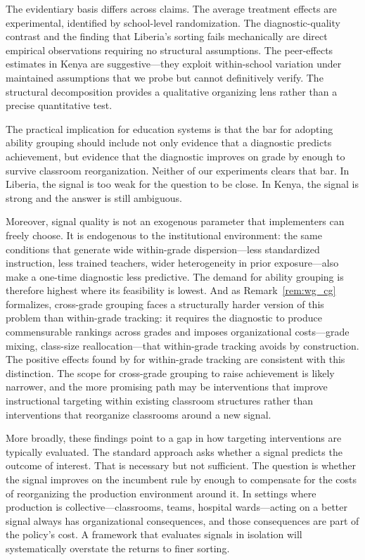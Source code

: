 \documentclass[11pt]{article}
\begin{document}
The evidentiary basis differs across claims. The average treatment effects are experimental, identified by school-level randomization. The diagnostic-quality contrast and the finding that Liberia's sorting fails mechanically are direct empirical observations requiring no structural assumptions. The peer-effects estimates in Kenya are suggestive---they exploit within-school variation under maintained assumptions that we probe but cannot definitively verify. The structural decomposition provides a qualitative organizing lens rather than a precise quantitative test.

The practical implication for education systems is that the bar for adopting ability grouping should include not only evidence that a diagnostic predicts achievement, but evidence that the diagnostic improves on grade by enough to survive classroom reorganization. Neither of our experiments clears that bar. In Liberia, the signal is too weak for the question to be close. In Kenya, the signal is strong and the answer is still ambiguous.

Moreover, signal quality is not an exogenous parameter that implementers can freely choose. It is endogenous to the institutional environment: the same conditions that generate wide within-grade dispersion---less standardized instruction, less trained teachers, wider heterogeneity in prior exposure---also make a one-time diagnostic less predictive. The demand for ability grouping is therefore highest where its feasibility is lowest. And as Remark~\ref{rem:wg_cg} formalizes, cross-grade grouping faces a structurally harder version of this problem than within-grade tracking: it requires the diagnostic to produce commensurable rankings across grades and imposes organizational costs---grade mixing, class-size reallocation---that within-grade tracking avoids by construction. The positive effects found by \citet{duflo2011peer} for within-grade tracking are consistent with this distinction. The scope for cross-grade grouping to raise achievement is likely narrower, and the more promising path may be interventions that improve instructional targeting within existing classroom structures rather than interventions that reorganize classrooms around a new signal.

More broadly, these findings point to a gap in how targeting interventions are typically evaluated. The standard approach asks whether a signal predicts the outcome of interest. That is necessary but not sufficient. The question is whether the signal improves on the incumbent rule by enough to compensate for the costs of reorganizing the production environment around it. In settings where production is collective---classrooms, teams, hospital wards---acting on a better signal always has organizational consequences, and those consequences are part of the policy's cost. A framework that evaluates signals in isolation will systematically overstate the returns to finer sorting.
\end{document}
